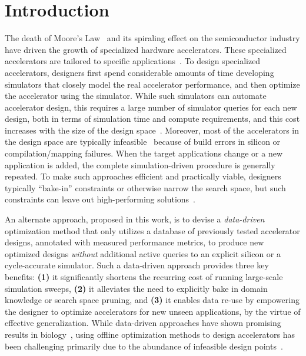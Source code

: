 \section{Introduction}
\label{sec:intro}
The death of Moore's Law~\citep{esmaeilzadeh2011dark} and its spiraling effect on the semiconductor industry have driven the growth of specialized hardware accelerators. These specialized accelerators are tailored to specific applications~\citep{yazdanbakhsh2021apollo,reagen2017case,prac_dse:mascots:2019,shi2020learned}. To design specialized accelerators, designers first spend considerable amounts of time developing simulators that closely model the real accelerator performance, and then optimize the accelerator using the simulator. While such simulators can automate accelerator design, this requires a large number of simulator queries for each new design, both in terms of simulation time and compute requirements, and this cost increases with the size of the design space~\citep{yazdanbakhsh2021evaluation,shi2020learned,hegdemind}.
%
Moreover, most of the accelerators in the design space are typically infeasible~\citep{hegdemind,yazdanbakhsh2021apollo} because of build errors in silicon or compilation/mapping failures. 
%
When the target applications change or a new application is added, the complete simulation-driven procedure is generally repeated.
%
To make such approaches efficient and practically viable, designers typically ``bake-in'' constraints or otherwise narrow the search space, but such constraints can leave out high-performing solutions~\citep{dmazerunner,timeloop,marvel}.

An alternate approach, proposed in this work, is to devise a \textit{data-driven} optimization method that only utilizes a database of previously tested accelerator designs, annotated with measured performance metrics, to produce new optimized designs \emph{without} additional active queries to an explicit silicon or a cycle-accurate simulator.
%
Such a data-driven approach provides three key benefits: \textbf{(1)} it significantly shortens the recurring cost of running large-scale simulation sweeps, \textbf{(2)} it alleviates the need to explicitly bake in domain knowledge or search space pruning, and {\textbf{(3)} it enables data re-use by empowering the designer to optimize accelerators for new unseen applications, by the virtue of effective generalization.}
%
While data-driven approaches have shown promising results in biology~\citep{fu2021offline,brookes19a,trabucco2021conservative},
using offline optimization methods to design accelerators 
has been challenging primarily due to the abundance of infeasible design points~\citep{yazdanbakhsh2021apollo,hegdemind}.

